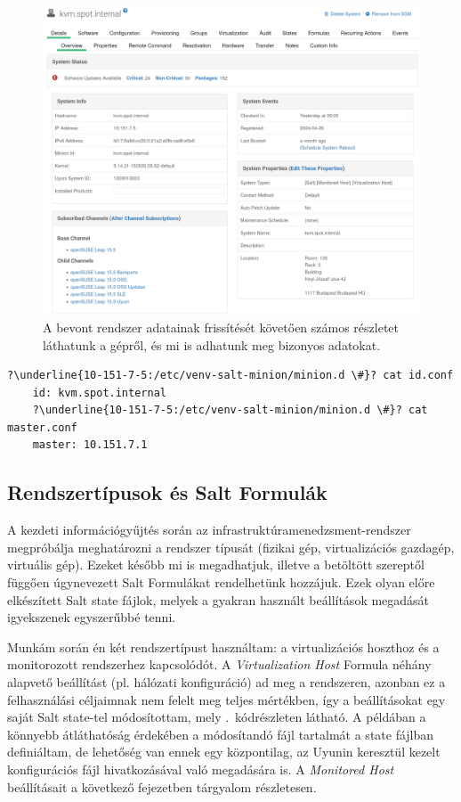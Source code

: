 \begin{figure}[ht]
	\centering
	\includegraphics[width=15cm]{figures/uyuni-system-details.png}
	\caption{A bevont rendszer adatainak frissítését követően számos részletet láthatunk a gépről, és mi is adhatunk meg bizonyos adatokat.}
	\label{fig:uyuni-system-details}
\end{figure}

\begin{lstlisting}[caption=A manuális konfiguráció során létrehozott állományok tartalma.,label=lst:salt-client-config,escapechar=?]
	?\underline{10-151-7-5:/etc/venv-salt-minion/minion.d \#}? cat id.conf
	id: kvm.spot.internal
	?\underline{10-151-7-5:/etc/venv-salt-minion/minion.d \#}? cat master.conf
	master: 10.151.7.1
\end{lstlisting}

\subsection{Rendszertípusok és Salt Formulák}
A kezdeti információgyűjtés során az infrastruktúramenedzsment-rendszer megpróbálja meghatározni a rendszer típusát (fizikai gép, virtualizációs gazdagép, virtuális gép). Ezeket később mi is megadhatjuk, illetve a betöltött szereptől függően úgynevezett Salt Formulákat rendelhetünk hozzájuk. Ezek olyan előre elkészített Salt state fájlok, melyek a gyakran használt beállítások megadását igyekszenek egyszerűbbé tenni.

Munkám során én két rendszertípust használtam: a virtualizációs hoszthoz és a monitorozott rendszerhez kapcsolódót. A \textit{Virtualization Host} Formula néhány alapvető beállítást (pl. hálózati konfiguráció) ad meg a rendszeren, azonban ez a felhasználási céljaimnak nem felelt meg teljes mértékben, így a beállításokat egy saját Salt state-tel módosítottam, mely .~kódrészleten látható. A példában a könnyebb átláthatóság érdekében a módosítandó fájl tartalmát a state fájlban definiáltam, de lehetőség van ennek egy központilag, az Uyunin keresztül kezelt konfigurációs fájl hivatkozásával való megadására is.
A \textit{Monitored Host} beállításait a következő fejezetben tárgyalom részletesen.

